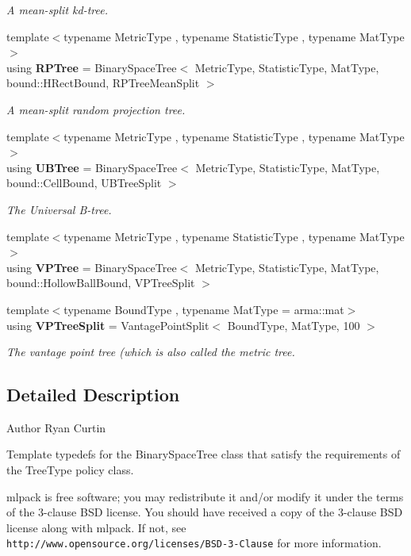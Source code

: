 \begin{DoxyCompactItemize}
\begin{DoxyCompactList}\small\item\em A mean-\/split kd-\/tree. \end{DoxyCompactList}\item 
{\footnotesize template$<$typename Metric\+Type , typename Statistic\+Type , typename Mat\+Type $>$ }\\using \textbf{ R\+P\+Tree} = Binary\+Space\+Tree$<$ Metric\+Type, Statistic\+Type, Mat\+Type, bound\+::\+H\+Rect\+Bound, R\+P\+Tree\+Mean\+Split $>$
\begin{DoxyCompactList}\small\item\em A mean-\/split random projection tree. \end{DoxyCompactList}\item 
{\footnotesize template$<$typename Metric\+Type , typename Statistic\+Type , typename Mat\+Type $>$ }\\using \textbf{ U\+B\+Tree} = Binary\+Space\+Tree$<$ Metric\+Type, Statistic\+Type, Mat\+Type, bound\+::\+Cell\+Bound, U\+B\+Tree\+Split $>$
\begin{DoxyCompactList}\small\item\em The Universal B-\/tree. \end{DoxyCompactList}\item 
{\footnotesize template$<$typename Metric\+Type , typename Statistic\+Type , typename Mat\+Type $>$ }\\using \textbf{ V\+P\+Tree} = Binary\+Space\+Tree$<$ Metric\+Type, Statistic\+Type, Mat\+Type, bound\+::\+Hollow\+Ball\+Bound, V\+P\+Tree\+Split $>$
\item 
{\footnotesize template$<$typename Bound\+Type , typename Mat\+Type  = arma\+::mat$>$ }\\using \textbf{ V\+P\+Tree\+Split} = Vantage\+Point\+Split$<$ Bound\+Type, Mat\+Type, 100 $>$
\begin{DoxyCompactList}\small\item\em The vantage point tree (which is also called the metric tree. \end{DoxyCompactList}\end{DoxyCompactItemize}


\subsection{Detailed Description}
\begin{DoxyAuthor}{Author}
Ryan Curtin
\end{DoxyAuthor}
Template typedefs for the Binary\+Space\+Tree class that satisfy the requirements of the Tree\+Type policy class.

mlpack is free software; you may redistribute it and/or modify it under the terms of the 3-\/clause B\+SD license. You should have received a copy of the 3-\/clause B\+SD license along with mlpack. If not, see {\tt http\+://www.\+opensource.\+org/licenses/\+B\+S\+D-\/3-\/\+Clause} for more information. 
